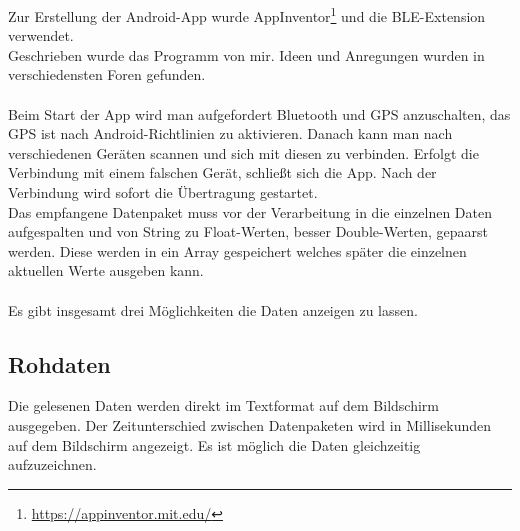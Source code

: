 Zur Erstellung der Android-App wurde AppInventor\footnote{\url{https://appinventor.mit.edu/}} und 
die BLE-Extension verwendet.\\
Geschrieben wurde das Programm von mir. Ideen und Anregungen wurden in verschiedensten 
Foren gefunden. \\
\\
Beim Start der App wird man aufgefordert Bluetooth und GPS anzuschalten, das GPS
ist nach Android-Richtlinien zu aktivieren. Danach kann man nach verschiedenen
Geräten scannen und sich mit diesen zu verbinden. Erfolgt die Verbindung mit einem
falschen Gerät, schließt sich die App. Nach der Verbindung wird sofort die Übertragung 
gestartet.\\
Das empfangene Datenpaket muss vor der Verarbeitung in die einzelnen Daten
aufgespalten und von String zu Float-Werten, besser Double-Werten, gepaarst werden.
Diese werden in ein Array gespeichert welches später
die einzelnen aktuellen Werte ausgeben kann.\\
\\
Es gibt insgesamt drei Möglichkeiten die Daten anzeigen zu lassen.

\subsection{Rohdaten}
Die gelesenen Daten werden direkt im Textformat auf dem Bildschirm ausgegeben.
Der Zeitunterschied zwischen Datenpaketen wird in Millisekunden auf dem Bildschirm
angezeigt.
Es ist möglich die Daten gleichzeitig aufzuzeichnen.


